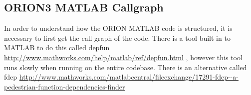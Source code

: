 
\begin{appendices}

\chapter{ORION3 MATLAB Callgraph}

In order to understand how the ORION MATLAB code is structured, it
is necessary to first get the call graph of the code. There is a
tool built in to MATLAB to do this called
depfun
\url{http://www.mathworks.com/help/matlab/ref/depfun.html} %
, however this tool runs slowly when running on the entire codebase.
There is an alternative called fdep
\url{http://www.mathworks.com/matlabcentral/fileexchange/17291-fdep--a-pedestrian-function-dependencies-finder}


\resizebox{1.0\textwidth}{!}{}

\resizebox{1.0\textwidth}{!}{}

\resizebox{1.0\textwidth}{!}{}

\end{appendices}
